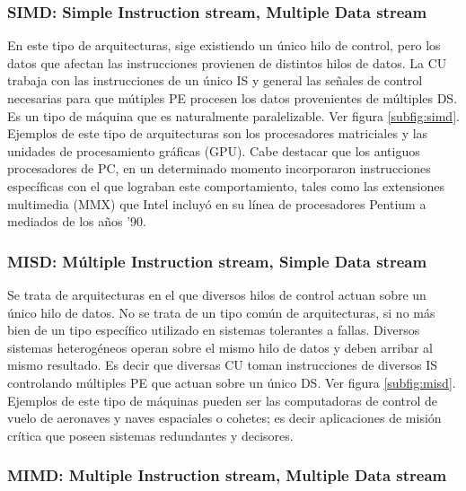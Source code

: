 \subsubsection{SIMD: Simple Instruction stream, Multiple Data stream}
\label{subsubsec:theory-modern-flynn_taxonomy-SIMD}

En este tipo de arquitecturas, sige existiendo un único hilo de control, pero 
los datos que afectan las instrucciones provienen de distintos hilos de datos. 
La CU trabaja con las instrucciones de un único IS y general las señales de 
control necesarias para que mútiples PE procesen los datos provenientes de 
múltiples DS. Es un tipo de máquina que es naturalmente paralelizable. Ver 
figura \ref{subfig:simd}.\\
Ejemplos de este tipo de arquitecturas son los procesadores matriciales y las 
unidades de procesamiento gráficas (GPU). Cabe destacar que los antiguos 
procesadores de PC, en un determinado momento incorporaron instrucciones 
específicas con el que lograban este comportamiento, tales como las extensiones 
multimedia (MMX) que Intel incluyó en su línea de procesadores Pentium a 
mediados de los años '90.

\subsubsection{MISD: Múltiple Instruction stream, Simple Data stream}
\label{subsubsec:theory-modern-flynn_taxonomy-MISD}

Se trata de arquitecturas en el que diversos hilos de control actuan sobre un 
único hilo de datos. No se trata de un tipo común de arquitecturas, si no más 
bien de un tipo específico utilizado en sistemas tolerantes a fallas. Diversos 
sistemas heterogéneos operan sobre el mismo hilo de datos y deben arribar al 
mismo resultado. Es decir que diversas CU toman instrucciones de diversos IS 
controlando múltiples PE que actuan sobre un único DS. Ver figura 
\ref{subfig:misd}.\\
Ejemplos de este tipo de máquinas pueden ser las computadoras de control de 
vuelo de aeronaves y naves espaciales o cohetes; es decir aplicaciones de 
misión crítica que poseen sistemas redundantes y decisores.

\subsubsection{MIMD: Multiple Instruction stream, Multiple Data stream}
\label{subsubsec:theory-modern-flynn_taxonomy-MIMD}

